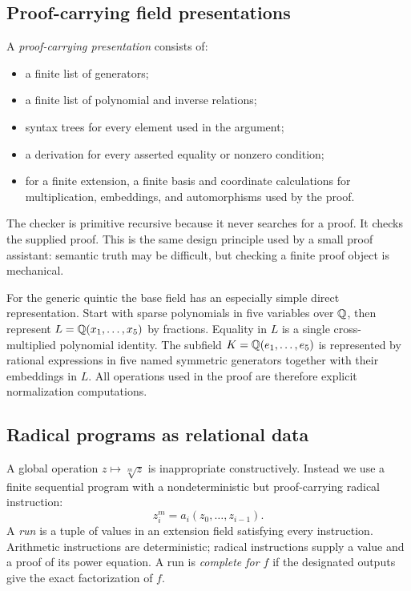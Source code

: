 \subsection{Proof-carrying field presentations}

A \emph{proof-carrying presentation} consists of:

\begin{itemize}
\item a finite list of generators;
\item a finite list of polynomial and inverse relations;
\item syntax trees for every element used in the argument;
\item a derivation for every asserted equality or nonzero condition;
\item for a finite extension, a finite basis and coordinate calculations for
  multiplication, embeddings, and automorphisms used by the proof.
\end{itemize}

The checker is primitive recursive because it never searches for a proof.
It checks the supplied proof.  This is the same design principle used by a
small proof assistant: semantic truth may be difficult, but checking a finite
proof object is mechanical.

For the generic quintic the base field has an especially simple direct
representation.  Start with sparse polynomials in five variables over $\mathbb Q$,
then represent $L=\mathbb Q(x_1,\ldots,x_5)$ by fractions.  Equality in $L$ is a
single cross-multiplied polynomial identity.  The subfield
$K=\mathbb Q(e_1,\ldots,e_5)$ is represented by rational expressions in five named
symmetric generators together with their embeddings in $L$.  All operations
used in the proof are therefore explicit normalization computations.

\subsection{Radical programs as relational data}

A global operation $z\mapsto\sqrt[m]{z}$ is inappropriate constructively.
Instead we use a finite sequential program with a nondeterministic but
proof-carrying radical instruction:
\[
  z_i^m = a_i(z_0,\ldots,z_{i-1}).
\]
A \emph{run} is a tuple of values in an extension field satisfying every
instruction.  Arithmetic instructions are deterministic; radical
instructions supply a value and a proof of its power equation.  A run is
\emph{complete for $f$} if the designated outputs give the exact factorization
of $f$.

